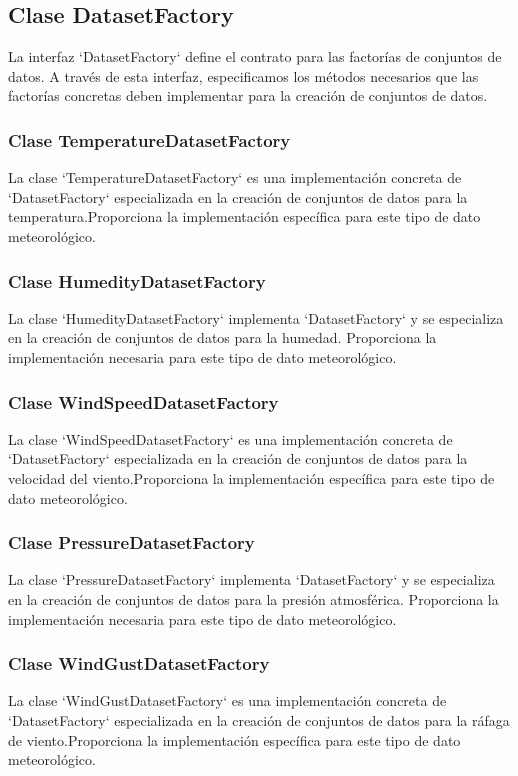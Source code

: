 \documentclass{article}
\begin{document}
\subsection{Clase DatasetFactory}
La interfaz `DatasetFactory` define el contrato para las factorías de conjuntos de datos. A través de esta interfaz, especificamos los métodos necesarios que las factorías concretas deben implementar para la creación de conjuntos de datos.

\subsubsection{Clase TemperatureDatasetFactory}
La clase `TemperatureDatasetFactory` es una implementación concreta de `DatasetFactory` especializada en la creación de conjuntos de datos para la temperatura.Proporciona la implementación específica para este tipo de dato meteorológico.

\subsubsection{Clase HumedityDatasetFactory}
La clase `HumedityDatasetFactory` implementa `DatasetFactory` y se especializa en la creación de conjuntos de datos para la humedad.  Proporciona la implementación necesaria para este tipo de dato meteorológico.

\subsubsection{Clase WindSpeedDatasetFactory}
La clase `WindSpeedDatasetFactory` es una implementación concreta de `DatasetFactory` especializada en la creación de conjuntos de datos para la velocidad del viento.Proporciona la implementación específica para este tipo de dato meteorológico.

\subsubsection{Clase PressureDatasetFactory}
La clase `PressureDatasetFactory` implementa `DatasetFactory` y se especializa en la creación de conjuntos de datos para la presión atmosférica. Proporciona la implementación necesaria para este tipo de dato meteorológico.

\subsubsection{Clase WindGustDatasetFactory}
La clase `WindGustDatasetFactory` es una implementación concreta de `DatasetFactory` especializada en la creación de conjuntos de datos para la ráfaga de viento.Proporciona la implementación específica para este tipo de dato meteorológico.
\end{document}
